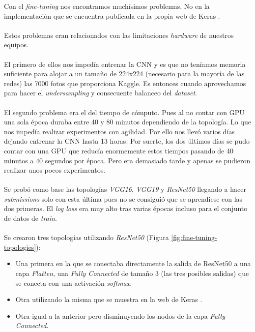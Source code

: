 Con el \textit{fine-tuning} nos encontramos muchísimos problemas. No en la implementación que se encuentra publicada en la propia web de Keras \cite{KerasApplications}.
\\ \\
Estos problemas eran relacionados con las limitaciones \textit{hardware} de nuestros equipos.
\\ \\
El primero de ellos nos impedía entrenar la CNN y es que no teníamos memoria suficiente para alojar a un tamaño de 224x224 (necesario para la mayoría de las redes) las 7000 fotos que proporciona Kaggle. Es entonces cuando aprovechamos para hacer el \textit{undersampling} y consecuente balanceo del \textit{dataset}.
\\ \\
El segundo problema era el del tiempo de cómputo. Pues al no contar con GPU una sola época duraba entre 40 y 80 minutos dependiendo de la topología. Lo que nos impedía realizar experimentos con agilidad. Por ello nos llevó varios días dejando entrenar la CNN hasta 13 horas. Por suerte, los dos últimos días se pudo contar con una GPU que reducía enormemente estos tiempos pasando de 40 minutos a 40 segundos por época. Pero era demasiado tarde y apenas se pudieron realizar unos pocos experimentos.
\\ \\
Se probó como base las topologías \textit{VGG16}, \textit{VGG19} y \textit{ResNet50} llegando a hacer \textit{submissions} solo con esta última pues no se consiguió que se aprendiese con las dos primeras. El \textit{log loss} era muy alto tras varias épocas incluso para el conjunto de datos de \textit{train}.
\\ \\
Se crearon tres topologías utilizando \textit{ResNet50} (Figura \ref{fig:fine-tuning-topologies}):

\begin{itemize}
	\item Una primera en la que se conectaba directamente la salida de ResNet50 a una capa \textit{Flatten}, una \textit{Fully Connected} de tamaño 3 (las tres posibles salidas) que se conecta con una activación \textit{softmax}.
	\item Otra utilizando la misma que se muestra en la web de Keras \cite{KerasApplications}.
	\item Otra igual a la anterior pero disminuyendo los nodos de la capa \textit{Fully Connected}.
\end{itemize}

